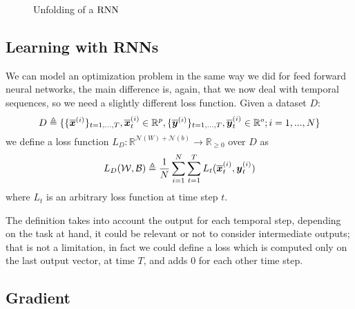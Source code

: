 \begin{figure}[h!]
\caption{Unfolding of a $\mathrm{RNN}$}
\label{rnn_unfolding}
\end{figure}


\subsection{Learning with RNNs}
We can model an optimization problem in the same way we did for feed forward neural networks, the main difference is, again, that we now deal with temporal sequences, so we need a slightly different loss function.
Given a dataset $D$:
\begin{equation}
D\triangleq\{\{\overline{\boldsymbol{x}}^{(i)}\}_{t=1,...,T}, \overline{\boldsymbol{x}}^{(i)}_t \in \mathbb{R}^p, \{\overline{\boldsymbol{y}}^{(i)}\}_{t=1,...,T}, \overline{\boldsymbol{y}}^{(i)}_t \in \mathbb{R}^o;  i=1,...,N\}
\end{equation}
we define a loss function $L_D:\mathbb{R}^{\mathcal{N}(W)+\mathcal{N}(b)} \rightarrow \mathbb{R}_{\geq 0}$ over $D$  as
\begin{equation}
L_D(\mathcal{W},\mathcal{B})\triangleq\frac{1}{N}\sum_{i=1}^N \sum_{t=1}^T L_t(\overline{\boldsymbol{x}}_t^{(i)},\boldsymbol{y}_t^{(i)}) 
\end{equation}
where $L_t$ is an arbitrary loss function at time step $t$.

The definition takes into account the output for each temporal step, depending on the task at hand, it could be relevant or not to consider intermediate
outputs; that is not a limitation, in fact we could define a loss which is computed only on the last output vector, at time $T$, and adds 0 for each
other time step.

\subsection{Gradient}






